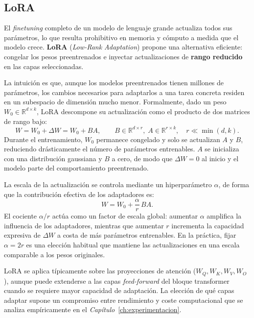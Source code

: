 \subsection{LoRA}\label{sec:LoRA}
El \textit{finetuning} completo de un modelo de lenguaje grande actualiza todos sus parámetros, lo que resulta prohibitivo en memoria y cómputo a medida que el modelo crece.
\textbf{LoRA} (\textit{Low-Rank Adaptation}) \cite{LoRA} propone una alternativa eficiente: congelar los pesos preentrenados e inyectar actualizaciones de \textbf{rango reducido} en las capas seleccionadas.

La intuición es que, aunque los modelos preentrenados tienen millones de parámetros, los cambios necesarios para adaptarlos a una tarea concreta residen en un subespacio de dimensión mucho menor.
Formalmente, dado un peso $W_0 \in \mathbb{R}^{d \times k}$, LoRA descompone su actualización como el producto de dos matrices de rango bajo:
\begin{equation*}
  W = W_0 + \Delta W = W_0 + BA,
  \qquad B \in \mathbb{R}^{d \times r},\; A \in \mathbb{R}^{r \times k},
  \quad r \ll \min(d, k).
\end{equation*}
Durante el entrenamiento, $W_0$ permanece congelado y solo se actualizan $A$ y $B$, reduciendo drásticamente el número de parámetros entrenables.
$A$ se inicializa con una distribución gaussiana y $B$ a cero, de modo que $\Delta W = 0$ al inicio y el modelo parte del comportamiento preentrenado.

La escala de la actualización se controla mediante un hiperparámetro $\alpha$, de forma que la contribución efectiva de los adaptadores es:
\begin{equation*}
  W = W_0 + \frac{\alpha}{r}\,BA.
\end{equation*}
El cociente $\alpha/r$ actúa como un factor de escala global: aumentar $\alpha$ amplifica la influencia de los adaptadores, mientras que aumentar $r$ incrementa la capacidad expresiva de $\Delta W$ a costa de más parámetros entrenables. En la práctica, fijar $\alpha = 2r$ es una elección habitual que mantiene las actualizaciones en una escala comparable a los pesos originales.

LoRA se aplica típicamente sobre las proyecciones de atención ($W_Q, W_K, W_V, W_O$), aunque puede extenderse a las capas \textit{feed-forward} del bloque transformer cuando se requiere mayor capacidad de adaptación.
La elección de qué capas adaptar supone un compromiso entre rendimiento y coste computacional que se analiza empíricamente en el \textit{Capítulo}~\ref{ch:experimentacion}.



